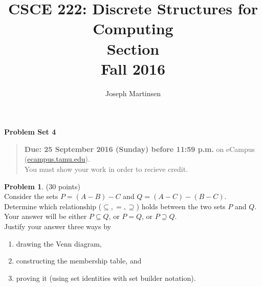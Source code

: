\documentclass{article}
\title{CSCE 222: Discrete Structures for Computing\\Section \mysectionnumber\\Fall 2016}
\author{Joseph Martinsen}
\theoremstyle{definition}
\newtheorem{problem}{Problem}
\newcommand{\problemset}[1]{\begin{center}\textbf{Problem Set #1}\end{center}}
\newcommand{\duedate}[1]{\begin{quote}\textbf{Due: #1} on eCampus (\url{ecampus.tamu.edu}). \\You must show your work in order to recieve credit.\end{quote}}
\begin{document}
\maketitle

\problemset{4}

\duedate{25 September 2016 (Sunday) before 11:59 p.m.}

\bigskip

\begin{problem} (30 points)\\
Consider the sets $P = (A-B)-C$ and $Q = (A-C) - (B-C)$.\\
Determine which relationship ($\subseteq,=,\supseteq$) holds between the two sets $P$ and $Q$.\\
Your answer will be either $P \subseteq Q$, or $P = Q$, or $P \supseteq Q$.\\
Justify your answer three ways by
  \begin{enumerate}
    \item drawing the Venn diagram,
    \item constructing the membership table, and
    \item proving it (using set identities with set builder notation).
  \end{enumerate}
  \end{problem}
\end{document}
